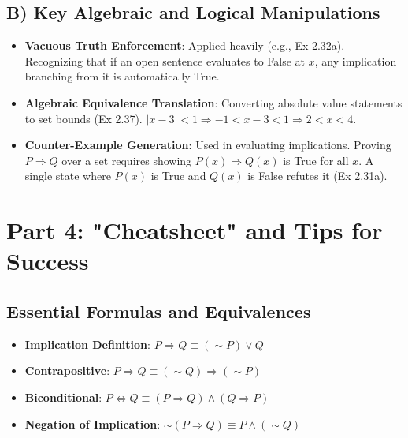 \documentclass[11pt]{article}
\begin{document}
\subsection{B) Key Algebraic and Logical Manipulations}
\begin{itemize}
    \item \textbf{Vacuous Truth Enforcement}: Applied heavily (e.g., Ex 2.32a). Recognizing that if an open sentence evaluates to False at $x$, any implication branching from it is automatically True.
    \item \textbf{Algebraic Equivalence Translation}: Converting absolute value statements to set bounds (Ex 2.37). $|x-3| < 1 \Rightarrow -1 < x - 3 < 1 \Rightarrow 2 < x < 4$. 
    \item \textbf{Counter-Example Generation}: Used in evaluating implications. Proving $P \Rightarrow Q$ over a set requires showing $P(x) \Rightarrow Q(x)$ is True for all $x$. A single state where $P(x)$ is True and $Q(x)$ is False refutes it (Ex 2.31a).
\end{itemize}

\section{Part 4: "Cheatsheet" and Tips for Success}

\subsection{Essential Formulas and Equivalences}
\begin{itemize}
    \item \textbf{Implication Definition}: $P \Rightarrow Q \equiv (\sim P) \vee Q$
    \item \textbf{Contrapositive}: $P \Rightarrow Q \equiv (\sim Q) \Rightarrow (\sim P)$
    \item \textbf{Biconditional}: $P \Leftrightarrow Q \equiv (P \Rightarrow Q) \wedge (Q \Rightarrow P)$
    \item \textbf{Negation of Implication}: $\sim (P \Rightarrow Q) \equiv P \wedge (\sim Q)$
\end{itemize}
\end{document}
